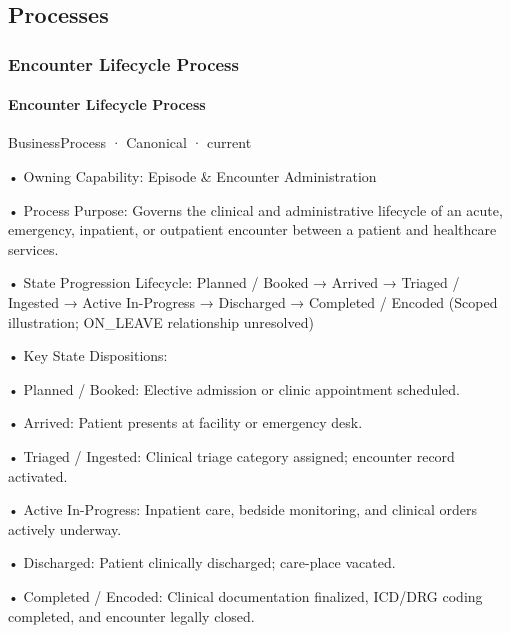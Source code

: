 \subsection{Processes}

\subsubsection{Encounter Lifecycle Process}

\paragraph{Encounter Lifecycle Process}

\label{element:df49e2e8bb3748f3abbdd1c28ae1be8f}
{\small BusinessProcess · Canonical · current}\par

•
Owning Capability: Episode \& Encounter Administration



•
Process Purpose: Governs the clinical and administrative lifecycle of an acute, emergency, inpatient, or outpatient encounter between a patient and healthcare services.



•
State Progression Lifecycle: Planned / Booked → Arrived → Triaged / Ingested → Active In-Progress → Discharged → Completed / Encoded   (Scoped illustration; ON\_LEAVE relationship unresolved)



•
Key State Dispositions:



•
Planned / Booked: Elective admission or clinic appointment scheduled.



•
Arrived: Patient presents at facility or emergency desk.



•
Triaged / Ingested: Clinical triage category assigned; encounter record activated.



•
Active In-Progress: Inpatient care, bedside monitoring, and clinical orders actively underway.



•
Discharged: Patient clinically discharged; care-place vacated.



•
Completed / Encoded: Clinical documentation finalized, ICD/DRG coding completed, and encounter legally closed.



